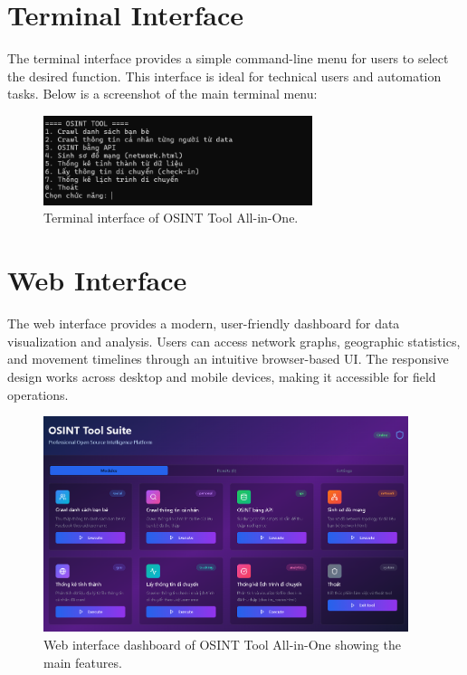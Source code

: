 \documentclass[13pt,a4paper]{report}
\begin{document}
\section{Terminal Interface}
The terminal interface provides a simple command-line menu for users to select the desired function. This interface is ideal for technical users and automation tasks. Below is a screenshot of the main terminal menu:
\begin{figure}[h!]
    \centering
    \includegraphics[width=0.7\textwidth]{4.png}
    \caption{Terminal interface of OSINT Tool All-in-One.}
\end{figure}

\section{Web Interface}
The web interface provides a modern, user-friendly dashboard for data visualization and analysis. Users can access network graphs, geographic statistics, and movement timelines through an intuitive browser-based UI. The responsive design works across desktop and mobile devices, making it accessible for field operations.
\begin{figure}[h!]
    \centering
    \includegraphics[width=0.95\textwidth]{web_dashboard.png}
    \caption{Web interface dashboard of OSINT Tool All-in-One showing the main features.}
\end{figure}

\end{document}
